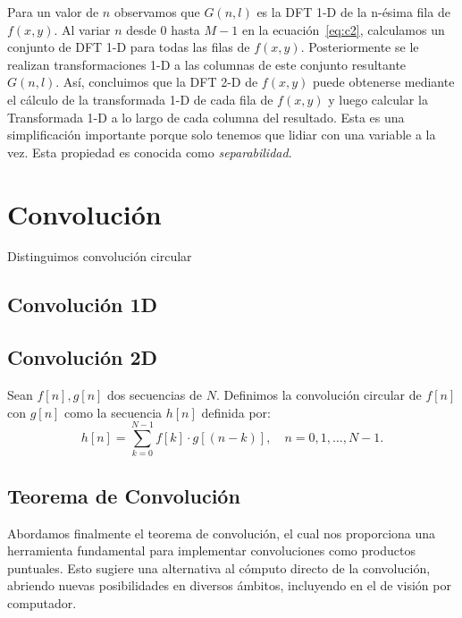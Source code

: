  
\noindent Para un valor de \(n\) observamos que \(G(n,l)\) es la DFT 1-D de la n-ésima fila de \(f(x, y)\). Al variar \(n\) desde 0 hasta \(M - 1\) en la ecuación~\eqref{eq:c2}, calculamos un conjunto de DFT 1-D para todas las filas de \(f(x, y)\). Posteriormente se le realizan transformaciones 1-D a las columnas de este conjunto resultante \(G(n,l)\). Así, concluimos que la DFT 2-D de \(f(x, y)\) puede obtenerse mediante el cálculo de la transformada 1-D de cada fila de \(f(x, y)\) y luego calcular la Transformada 1-D a lo largo de cada columna del resultado. Esta es una simplificación importante porque solo tenemos que lidiar con una variable a la vez.
Esta propiedad es conocida como \textit{separabilidad}.





\section{Convolución}

Distinguimos convolución circular






\subsection{Convolución 1D}

\subsection{Convolución 2D}
\begin{definicion}
Sean $f[n], g[n]$ dos secuencias de  $N$. Definimos la convolución circular de $f[n]$ con $g[n]$ como la secuencia $h[n]$ definida por:
\begin{equation}
     h[n] = \sum_{k=0}^{N-1} f[k] \cdot g[(n-k)], \quad n = 0,1,\ldots,N-1.
\end{equation}
\end{definicion}




\subsection{Teorema de Convolución}
\noindent

\noindent Abordamos finalmente el teorema de convolución, el cual nos proporciona una herramienta fundamental para implementar convoluciones como productos puntuales. Esto sugiere una alternativa al cómputo directo de la convolución, abriendo nuevas posibilidades en diversos ámbitos, incluyendo en el de visión por computador.

